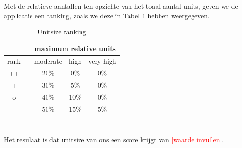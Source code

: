 \documentclass[a4paper]{article}
\newcommand{\todo}[1]{\textcolor{red}{[#1]}}
\begin{document}
Met de relatieve aantallen ten opzichte van het toaal aantal units, geven we de applicatie een ranking, zoals we deze in Tabel \ref{tbl:UnitsizeRanking} hebben weergegeven.

\begin{table}[h]
\caption{Unitsize ranking}
\label{tbl:UnitsizeRanking}
\begin{tabular}{cl|lll|}
\cline{3-5}
\multicolumn{1}{l}{}       &  & \multicolumn{3}{c|}{maximum relative units}                                              \\ \hline
\multicolumn{1}{|c|}{rank} &  & \multicolumn{1}{c}{moderate} & \multicolumn{1}{c}{high} & \multicolumn{1}{c|}{very high} \\ \hline
\multicolumn{1}{|c|}{++}   &  & \multicolumn{1}{c}{20\%}     & \multicolumn{1}{c}{0\%}  & \multicolumn{1}{c|}{0\%}       \\
\multicolumn{1}{|c|}{+}    &  & \multicolumn{1}{c}{30\%}     & \multicolumn{1}{c}{5\%}  & \multicolumn{1}{c|}{0\%}       \\
\multicolumn{1}{|c|}{o}    &  & \multicolumn{1}{c}{40\%}     & \multicolumn{1}{c}{10\%} & \multicolumn{1}{c|}{0\%}       \\
\multicolumn{1}{|c|}{-}    &  & \multicolumn{1}{c}{50\%}     & \multicolumn{1}{c}{15\%} & \multicolumn{1}{c|}{5\%}       \\
\multicolumn{1}{|c|}{--}   &  & \multicolumn{1}{c}{-}        & \multicolumn{1}{c}{-}    & \multicolumn{1}{c|}{-}         \\ \hline
\end{tabular}
\end{table}

Het resulaat is dat unitsize van ons een score krijgt van \todo{waarde invullen}.
\end{document}
